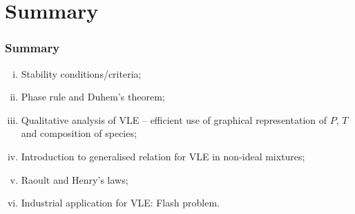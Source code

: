 \documentclass[10pt,compress,unknownkeysallowed]{beamer}
\begin{document}
\section{Summary}

\begin{frame}
 \frametitle{Summary}
   \begin{enumerate}[(i)]
     \item Stability conditions/criteria;
     \item Phase rule and Duhem's theorem;
     \item Qualitative analysis of VLE -- efficient use of graphical representation of $P$, $T$ and composition of species;
     \item Introduction to generalised relation for VLE in non-ideal mixtures;
     \item Raoult and Henry's laws; 
     \item Industrial application for VLE: Flash problem.
   \end{enumerate}
\end{frame}
\end{document}
